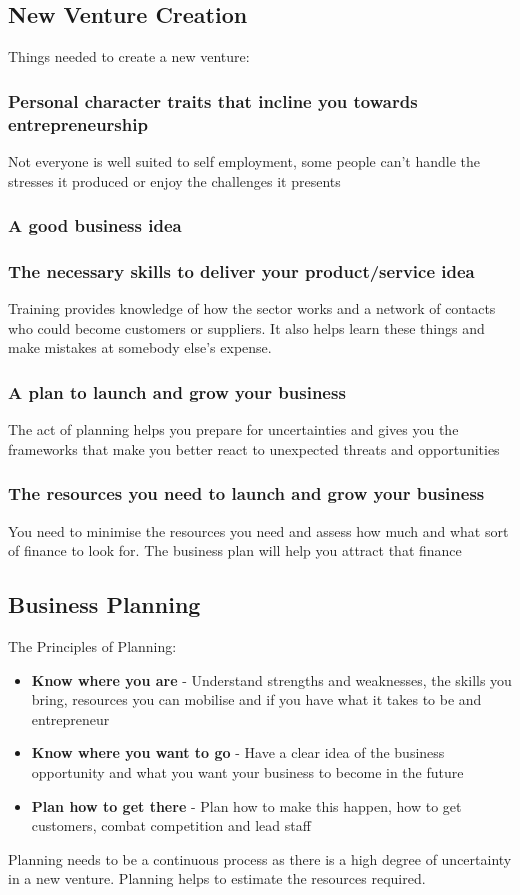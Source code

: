 \documentclass{article}[18pt]
\begin{document}
\subsection{New Venture Creation}
Things needed to create a new venture:
\subsubsection{Personal character traits that incline you towards entrepreneurship}
Not everyone is well suited to self employment, some people can't handle the stresses it produced or enjoy the challenges it presents
\subsubsection{A good business idea}
\subsubsection{The necessary skills to deliver your product/service idea}
Training provides knowledge of how the sector works and a network of contacts who could become customers or suppliers. It also helps learn these things and make mistakes at somebody else's expense. 
\subsubsection{A plan to launch and grow your business}
The act of planning helps you prepare for uncertainties and gives you the frameworks that make you better react to unexpected threats and opportunities
\subsubsection{The resources you need to launch and grow your business}
You need to minimise the resources you need and assess how much and what sort of finance to look for. The business plan will help you attract that finance
\subsection{Business Planning}
The Principles of Planning:
\begin{itemize}
\item \textbf{Know where you are} - Understand strengths and weaknesses, the skills you bring, resources you can mobilise and if you have what it takes to be and entrepreneur
\item \textbf{Know where you want to go} - Have a clear idea of the business opportunity and what you want your business to become in the future
\item \textbf{Plan how to get there} - Plan how to make this happen, how to get customers, combat competition and lead staff
\end{itemize}
Planning needs to be a continuous process as there is a high degree of uncertainty in a new venture. Planning helps to estimate the resources required.
\end{document}
